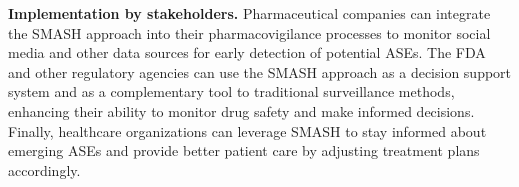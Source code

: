 \documentclass[referee,bst/sn-basic]{sn-jnl}%
\theoremstyle{thmstyletwo}%
\theoremstyle{thmstylethree}%
\begin{document}
\textbf{Implementation by stakeholders.} 
Pharmaceutical companies can integrate the SMASH approach into their pharmacovigilance processes to monitor social media and other data sources for early detection of potential ASEs.
The FDA and other regulatory agencies can use the SMASH approach as a decision support system and as a 
complementary tool to traditional surveillance methods, enhancing their ability to monitor drug safety and make informed decisions.
Finally, healthcare organizations can leverage SMASH to stay informed about emerging ASEs and provide better patient care by adjusting treatment plans accordingly.



\end{document}
